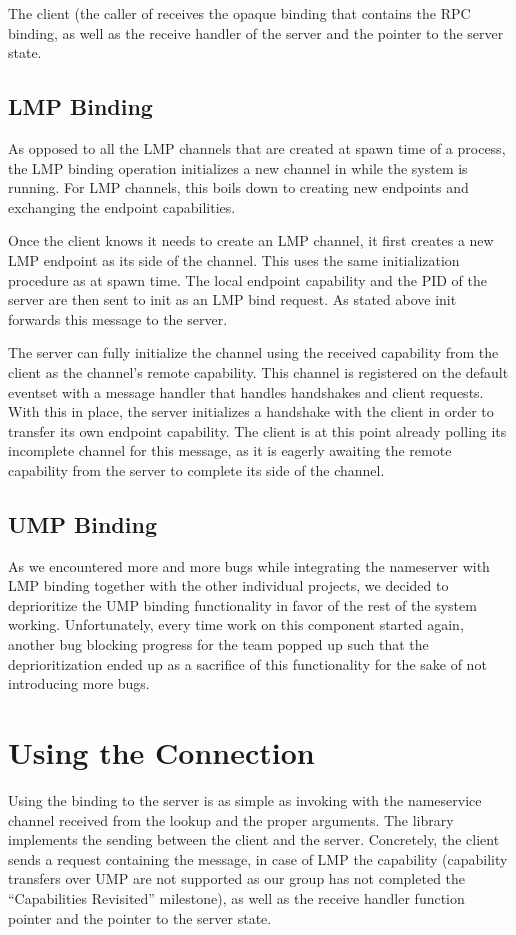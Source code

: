 The client (the caller of  receives the opaque  binding
that contains the RPC binding, as well as the receive handler of the server and the pointer to the server state.

\subsection{LMP Binding}
As opposed to all the LMP channels that are created at spawn time of a process, the LMP binding operation
initializes a new channel in while the system is running. For LMP channels, this boils down to creating
new endpoints and exchanging the endpoint capabilities. 

Once the client knows it needs to create an LMP channel, it first creates a new LMP endpoint as its side of
the channel. This uses the same initialization procedure as at spawn time. The local endpoint capability and
the PID of the server are then sent to init as an LMP bind request. As stated above init forwards this message
to the server.

The server can fully initialize the channel using the received capability from the client as the channel's
remote capability. This channel is registered on the default eventset with a message handler that handles
handshakes and client requests. With this in place, the server initializes a handshake with the client in order to transfer
its own endpoint capability. The client is at this point already polling its incomplete channel for this message,
as it is eagerly awaiting the remote capability from the server to complete its side of the channel.

\subsection{UMP Binding}
As we encountered more and more bugs while integrating the nameserver with LMP binding together with the
other individual projects, we decided to deprioritize the UMP binding functionality in favor of the rest
of the system working. Unfortunately, every time work on this component started again, another bug blocking
progress for the team popped up such that the deprioritization ended up as a sacrifice of this functionality
for the sake of not introducing more bugs.

\section{Using the Connection}
Using the binding to the server is as simple as invoking  with the nameservice channel
received from the lookup and the proper arguments. The library implements the sending between the client and
the server. Concretely, the client sends a request containing the message, in case of LMP the capability
(capability transfers over UMP are not supported as our group has not completed the \enquote{Capabilities Revisited}
milestone), as well as the receive handler function pointer and the pointer to the server state.

